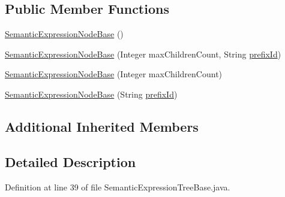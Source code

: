 \subsection*{Public Member Functions}
\begin{DoxyCompactItemize}
\item 
\hyperlink{classit_1_1emarolab_1_1cagg_1_1core_1_1evaluation_1_1semanticGrammar_1_1syntaxCompiler_1_1Semantec1f2fc886c35d505e2bc10592e2dff6_a57b66a49c81de773bdc8f57d472020a6}{Semantic\-Expression\-Node\-Base} ()
\item 
\hyperlink{classit_1_1emarolab_1_1cagg_1_1core_1_1evaluation_1_1semanticGrammar_1_1syntaxCompiler_1_1Semantec1f2fc886c35d505e2bc10592e2dff6_a4ac663d89c7ac669c5a83c03b06d01df}{Semantic\-Expression\-Node\-Base} (Integer max\-Children\-Count, String \hyperlink{classit_1_1emarolab_1_1cagg_1_1core_1_1BaseNode_a1e4662066a1e580f3ef9a1ad7c483dd8}{prefix\-Id})
\item 
\hyperlink{classit_1_1emarolab_1_1cagg_1_1core_1_1evaluation_1_1semanticGrammar_1_1syntaxCompiler_1_1Semantec1f2fc886c35d505e2bc10592e2dff6_a1e9d5fc9b5884083c6b6af28033ba774}{Semantic\-Expression\-Node\-Base} (Integer max\-Children\-Count)
\item 
\hyperlink{classit_1_1emarolab_1_1cagg_1_1core_1_1evaluation_1_1semanticGrammar_1_1syntaxCompiler_1_1Semantec1f2fc886c35d505e2bc10592e2dff6_ad231c88ac4fe9699019ba91c028c3c77}{Semantic\-Expression\-Node\-Base} (String \hyperlink{classit_1_1emarolab_1_1cagg_1_1core_1_1BaseNode_a1e4662066a1e580f3ef9a1ad7c483dd8}{prefix\-Id})
\end{DoxyCompactItemize}
\subsection*{Additional Inherited Members}


\subsection{Detailed Description}


Definition at line 39 of file Semantic\-Expression\-Tree\-Base.\-java.



